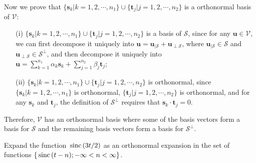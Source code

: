 \documentclass{assignment}
\begin{document}
\begin{sol}
\begin{itemize}
        Now we prove that $\{\bm{s}_k\vert k=1,2,\cdots,n_1\}\cup\{\bm{t}_j\vert j=1,2,\cdots,n_2\}$ is a orthonormal basis of $\mathcal{V}$:
        \begin{itemize}
            \item[(i)] $\{\bm{s}_k\vert k=1,2,\cdots,n_1\}\cup\{\bm{t}_j\vert j=1,2,\cdots,n_2\}$ is a basis of $\mathcal{S}$, since for any $\bm{u}\in\mathcal{V}$, we can first decompose it uniquely into $\bm{u}=\bm{u}_{\vert\mathcal{S}}+\bm{u}_{\perp\mathcal{S}}$, where $\bm{u}_{\vert\mathcal{S}}\in\mathcal{S}$ and $\bm{u}_{\perp\mathcal{S}}\in\mathcal{S}^{\perp}$, and then decompose it uniquely into $\bm{u}=\sum_{k=1}^{n_1}\alpha_k\bm{s}_k+\sum_{j=1}^{n_2}\beta_j\bm{t}_j$;
            \item[(ii)] $\{\bm{s}_k\vert k=1,2,\cdots,n_1\}\cup\{\bm{t}_j\vert j=1,2,\cdots,n_2\}$ is orthonormal, since $\{\bm{s}_k\vert k=1,2,\cdots,n_1\}$ is orthonormal, $\{\bm{t}_j\vert j=1,2,\cdots,n_2\}$ is orthonormal, and for any $\bm{s}_k$ and $\bm{t}_j$, the definition of $\mathcal{S}^{\perp}$ requires that $\bm{s}_k\cdot\bm{t}_j=0$.
        \end{itemize}
        Therefore, $\mathcal{V}$ has an orthonormal basis where some of the basis vectors form a basis for $\mathcal{S}$ and the remaining basis vectors form a basis for $\mathcal{S}^{\perp}$.
    \end{itemize}
\end{sol}

\begin{prob}
    Expand the function $\,\text{sinc}\,(3t/2)$ as an orthonormal expansion in the set of functions $\{\,\text{sinc}\,(t-n);-\infty<n<\infty\}$.
\end{prob}
\begin{sol}
\end{sol}
\end{document}
